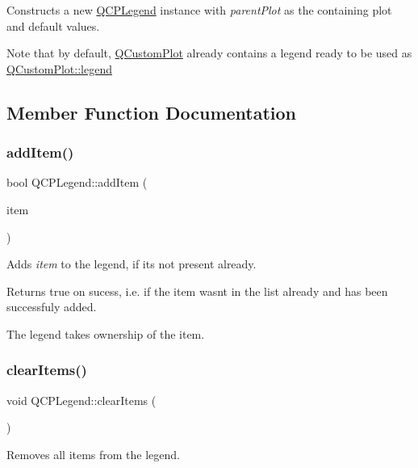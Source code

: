 Constructs a new \hyperlink{class_q_c_p_legend}{Q\+C\+P\+Legend} instance with {\itshape parent\+Plot} as the containing plot and default values.

Note that by default, \hyperlink{class_q_custom_plot}{Q\+Custom\+Plot} already contains a legend ready to be used as \hyperlink{class_q_custom_plot_a4eadcd237dc6a09938b68b16877fa6af}{Q\+Custom\+Plot\+::legend} 

\subsection{Member Function Documentation}
\hypertarget{class_q_c_p_legend_a3ab274de52d2951faea45a6d975e6b3f}{}\label{class_q_c_p_legend_a3ab274de52d2951faea45a6d975e6b3f} 
\subsubsection{\texorpdfstring{add\+Item()}{addItem()}}
{\footnotesize\ttfamily bool Q\+C\+P\+Legend\+::add\+Item (\begin{DoxyParamCaption}\item[{\hyperlink{class_q_c_p_abstract_legend_item}{Q\+C\+P\+Abstract\+Legend\+Item} $\ast$}]{item }\end{DoxyParamCaption})}

Adds {\itshape item} to the legend, if it\textquotesingle{}s not present already.

Returns true on sucess, i.\+e. if the item wasn\textquotesingle{}t in the list already and has been successfuly added.

The legend takes ownership of the item. \hypertarget{class_q_c_p_legend_a24795c7250eb5214fcea16b7217b4dfb}{}\label{class_q_c_p_legend_a24795c7250eb5214fcea16b7217b4dfb} 
\subsubsection{\texorpdfstring{clear\+Items()}{clearItems()}}
{\footnotesize\ttfamily void Q\+C\+P\+Legend\+::clear\+Items (\begin{DoxyParamCaption}{ }\end{DoxyParamCaption})}

Removes all items from the legend. \hypertarget{class_q_c_p_legend_ad0f698e33db454a6c103b5206740e599}{}\label{class_q_c_p_legend_ad0f698e33db454a6c103b5206740e599} 
